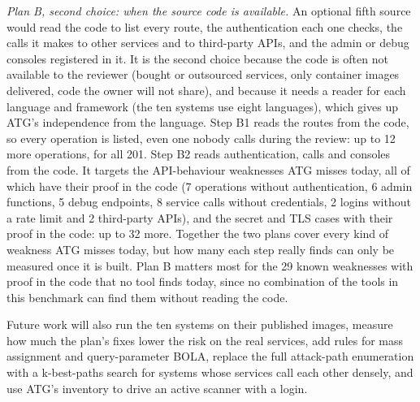 \documentclass[conference]{IEEEtran}
\begin{document}
\textit{Plan B, second choice: when the source code is available.} An optional fifth source would read the code to list every route, the authentication each one checks, the calls it makes to other services and to third-party APIs, and the admin or debug consoles registered in it. It is the second choice because the code is often not available to the reviewer (bought or outsourced services, only container images delivered, code the owner will not share), and because it needs a reader for each language and framework (the ten systems use eight languages), which gives up ATG's independence from the language. Step B1 reads the routes from the code, so every operation is listed, even one nobody calls during the review: up to 12 more operations, for all 201. Step B2 reads authentication, calls and consoles from the code. It targets the API-behaviour weaknesses ATG misses today, all of which have their proof in the code (7 operations without authentication, 6 admin functions, 5 debug endpoints, 8 service calls without credentials, 2 logins without a rate limit and 2 third-party APIs), and the secret and TLS cases with their proof in the code: up to 32 more. Together the two plans cover every kind of weakness ATG misses today, but how many each step really finds can only be measured once it is built. Plan B matters most for the 29 known weaknesses with proof in the code that no tool finds today, since no combination of the tools in this benchmark can find them without reading the code.

Future work will also run the ten systems on their published images, measure how much the plan's fixes lower the risk on the real services, add rules for mass assignment and query-parameter BOLA, replace the full attack-path enumeration with a k-best-paths search for systems whose services call each other densely, and use ATG's inventory to drive an active scanner with a login.
\end{document}

